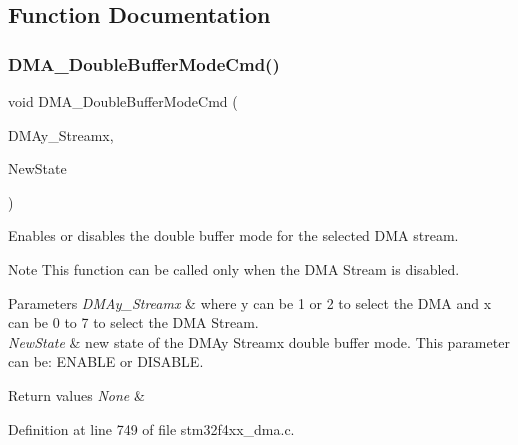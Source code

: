 \subsection{Function Documentation}
\mbox{\label{group___d_m_a___group3_ga7fe09e62ea3125db384829dab59ebe3e}} 
\subsubsection{\texorpdfstring{D\+M\+A\+\_\+\+Double\+Buffer\+Mode\+Cmd()}{DMA\_DoubleBufferModeCmd()}}
{\footnotesize\ttfamily void D\+M\+A\+\_\+\+Double\+Buffer\+Mode\+Cmd (\begin{DoxyParamCaption}\item[{\hyperlink{struct_d_m_a___stream___type_def}{D\+M\+A\+\_\+\+Stream\+\_\+\+Type\+Def} $\ast$}]{D\+M\+Ay\+\_\+\+Streamx,  }\item[{Functional\+State}]{New\+State }\end{DoxyParamCaption})}



Enables or disables the double buffer mode for the selected D\+MA stream. 

\begin{DoxyNote}{Note}
This function can be called only when the D\+MA Stream is disabled. 
\end{DoxyNote}

\begin{DoxyParams}{Parameters}
{\em D\+M\+Ay\+\_\+\+Streamx} & where y can be 1 or 2 to select the D\+MA and x can be 0 to 7 to select the D\+MA Stream. \\
\hline
{\em New\+State} & new state of the D\+M\+Ay Streamx double buffer mode. This parameter can be\+: E\+N\+A\+B\+LE or D\+I\+S\+A\+B\+LE. \\
\hline
\end{DoxyParams}

\begin{DoxyRetVals}{Return values}
{\em None} & \\
\hline
\end{DoxyRetVals}


Definition at line 749 of file stm32f4xx\+\_\+dma.\+c.

